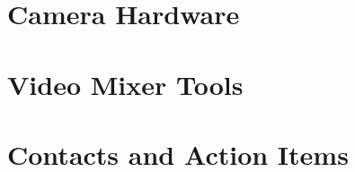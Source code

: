 \documentclass[aspectratio=169]{beamer}
\begin{document}

% 


\section{Camera Hardware}

% 



\section{Video Mixer Tools}





\section{Contacts and Action Items}

% 
% 


\end{document}
